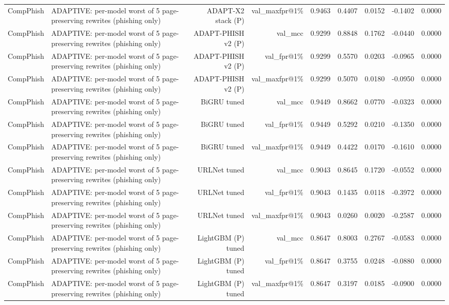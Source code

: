 \begin{table}[t]
\begin{tabular}{llrrrrrrr}
CompPhish & ADAPTIVE: per-model worst of 5 page-preserving rewrites (phishing only) & ADAPT-X2 stack (P) & val\_maxfpr@1\% & 0.9463 & 0.4407 & 0.0152 & -0.1402 & 0.0000 \\
CompPhish & ADAPTIVE: per-model worst of 5 page-preserving rewrites (phishing only) & ADAPT-PHISH v2 (P) & val\_mcc & 0.9299 & 0.8848 & 0.1762 & -0.0440 & 0.0000 \\
CompPhish & ADAPTIVE: per-model worst of 5 page-preserving rewrites (phishing only) & ADAPT-PHISH v2 (P) & val\_fpr@1\% & 0.9299 & 0.5570 & 0.0203 & -0.0965 & 0.0000 \\
CompPhish & ADAPTIVE: per-model worst of 5 page-preserving rewrites (phishing only) & ADAPT-PHISH v2 (P) & val\_maxfpr@1\% & 0.9299 & 0.5070 & 0.0180 & -0.0950 & 0.0000 \\
CompPhish & ADAPTIVE: per-model worst of 5 page-preserving rewrites (phishing only) & BiGRU tuned & val\_mcc & 0.9449 & 0.8662 & 0.0770 & -0.0323 & 0.0000 \\
CompPhish & ADAPTIVE: per-model worst of 5 page-preserving rewrites (phishing only) & BiGRU tuned & val\_fpr@1\% & 0.9449 & 0.5292 & 0.0210 & -0.1350 & 0.0000 \\
CompPhish & ADAPTIVE: per-model worst of 5 page-preserving rewrites (phishing only) & BiGRU tuned & val\_maxfpr@1\% & 0.9449 & 0.4422 & 0.0170 & -0.1610 & 0.0000 \\
CompPhish & ADAPTIVE: per-model worst of 5 page-preserving rewrites (phishing only) & URLNet tuned & val\_mcc & 0.9043 & 0.8645 & 0.1720 & -0.0552 & 0.0000 \\
CompPhish & ADAPTIVE: per-model worst of 5 page-preserving rewrites (phishing only) & URLNet tuned & val\_fpr@1\% & 0.9043 & 0.1435 & 0.0118 & -0.3972 & 0.0000 \\
CompPhish & ADAPTIVE: per-model worst of 5 page-preserving rewrites (phishing only) & URLNet tuned & val\_maxfpr@1\% & 0.9043 & 0.0260 & 0.0020 & -0.2587 & 0.0000 \\
CompPhish & ADAPTIVE: per-model worst of 5 page-preserving rewrites (phishing only) & LightGBM (P) tuned & val\_mcc & 0.8647 & 0.8003 & 0.2767 & -0.0583 & 0.0000 \\
CompPhish & ADAPTIVE: per-model worst of 5 page-preserving rewrites (phishing only) & LightGBM (P) tuned & val\_fpr@1\% & 0.8647 & 0.3755 & 0.0248 & -0.0880 & 0.0000 \\
CompPhish & ADAPTIVE: per-model worst of 5 page-preserving rewrites (phishing only) & LightGBM (P) tuned & val\_maxfpr@1\% & 0.8647 & 0.3197 & 0.0185 & -0.0900 & 0.0000 \\

\end{tabular}
\end{table}
